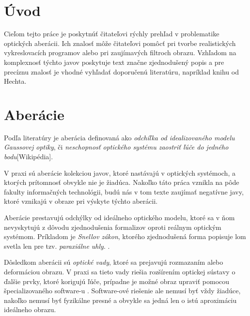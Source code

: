 \section{Úvod}
Cieľom tejto práce je poskytnúť čitateľovi rýchly prehľad v problematike optických aberácii.
Ich znalosť môže čitateľovi pomôcť pri tvorbe realistických vykreslovacích programov alebo
pri zaujímavých filtroch obrazu. Vzhľadom na komplexnosť týchto javov poskytuje text značne 
zjednodušený popis a pre precíznu znalosť je vhodné vyhľadať doporučenú literatúru, napríklad knihu
od Hechta\cite{hechtoptics}.

\section{Aberácie}
Podľa literatúry je aberácia definovaná ako \textit{odchíľka od idealizovaného modelu Gaussovej
optiky}\cite{hechtoptics}, či \textit{neschopnosť optického systému zaostriť ľúče do jedného bodu}[Wikipédia].

V praxi sú aberácie kolekciou javov, ktoré nastávajú v optických systémoch, a ktorých prítomnosť
obvykle nie je žiadúca. Nakoľko táto práca vznikla na pôde fakulty informačných technológii, budú
nás v tom texte zaujímať negatívne javy, ktoré vznikajú v obraze pri výskyte týchto aberácii.

Aberácie prestavujú odchýlky od ideálneho optického modelu, ktoré sa v ňom nevyskytujú z dôvodu
zjednodušenia formalizov oproti reálnym optickým systémom. Príkladom je \textit{Snellov zákon},
ktorého zjednodušená forma popisuje lom svetla len pre tzv. \textit{paraxiálne uhly}. \cite{hechtoptics}.

Dôsledkom aberácii sú \textit{optické vady}, ktoré sa prejavujú rozmazaním alebo deformáciou obrazu. V praxi sa tieto
vady riešia rozšírením optickej sústavy o ďalšie prvky, ktoré korigujú ľúče, prípadne je možné obraz
upraviť pomocou špecializovaného software-u \cite{automaticRemovalCA}. Software-ové riešenie ale
nemusí byť vždy žiadúce, nakoľko nemusí
byť fyzikálne presné a obvykle sa jedná len o istú aproximáciu ideálneho obrazu.

